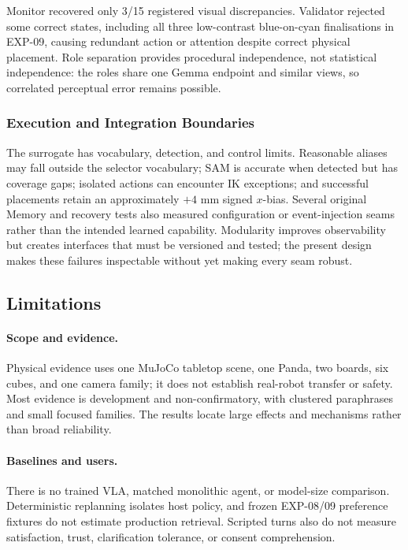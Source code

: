 \documentclass{article}
\begin{document}
Monitor recovered only 3/15 registered visual discrepancies. Validator rejected
some correct states, including all three low-contrast blue-on-cyan finalisations
in EXP-09, causing redundant action or attention despite correct physical
placement. Role separation provides procedural independence, not statistical
independence: the roles share one Gemma endpoint and similar views, so correlated
perceptual error remains possible.

\subsubsection{Execution and Integration Boundaries}

The surrogate has vocabulary, detection, and control limits. Reasonable aliases
may fall outside the selector vocabulary; SAM is accurate when detected but has
coverage gaps; isolated actions can encounter IK exceptions; and successful
placements retain an approximately $+4$ mm signed $x$-bias. Several original
Memory and recovery tests also measured configuration or event-injection seams
rather than the intended learned capability. Modularity improves observability
but creates interfaces that must be versioned and tested; the present design
makes these failures inspectable without yet making every seam robust.

\subsection{Limitations}
\label{subsec:discussion-limitations}

\paragraph{Scope and evidence.}
Physical evidence uses one MuJoCo tabletop scene, one Panda, two boards, six
cubes, and one camera family; it does not establish real-robot transfer or
safety. Most evidence is development and non-confirmatory, with clustered
paraphrases and small focused families. The results locate large effects and
mechanisms rather than broad reliability.

\paragraph{Baselines and users.}
There is no trained VLA, matched monolithic agent, or model-size comparison.
Deterministic replanning isolates host policy, and frozen EXP-08/09 preference
fixtures do not estimate production retrieval. Scripted turns also do not
measure satisfaction, trust, clarification tolerance, or consent comprehension.
\end{document}

